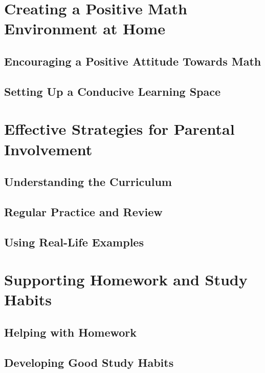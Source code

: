 \documentclass{book}
\begin{document}
\section{Creating a Positive Math Environment at Home}
\subsection{Encouraging a Positive Attitude Towards Math}
\subsection{Setting Up a Conducive Learning Space}


\section{Effective Strategies for Parental Involvement}
\subsection{Understanding the Curriculum}
\subsection{Regular Practice and Review}
\subsection{Using Real-Life Examples}


\section{Supporting Homework and Study Habits}
\subsection{Helping with Homework}
\subsection{Developing Good Study Habits}
\end{document}
